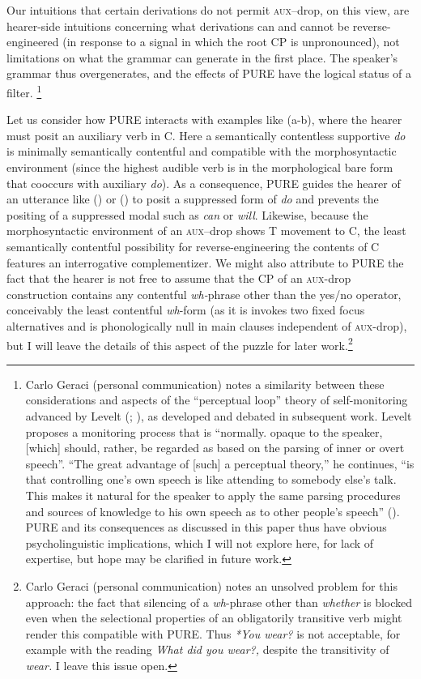 \documentclass[output=paper]{langscibook}
\begin{document}
Our intuitions that certain derivations do not permit \textsc{aux}--drop, on this view, are hearer-side intuitions concerning what derivations can and cannot be reverse-engineered (in response to a signal in which the root CP is unpronounced), not limitations on what the grammar can generate in the first place. The speaker's grammar thus overgenerates, and the effects of PURE have the logical status of a filter. \footnote{Carlo Geraci (personal communication) notes a similarity between these considerations and aspects of the “perceptual loop” theory of self-monitoring advanced by Levelt (\citeyear[96]{Levelt:1983aa}; \citeyear[chapter 12]{Levelt:1989aa}), as developed and debated in subsequent work. Levelt proposes a monitoring process that is “normally. opaque to the speaker, {[}which{]} should, rather, be regarded as based on the parsing of inner or overt speech”. “The great advantage of {[}such{]} a perceptual theory,” he continues, “is that controlling one’s own speech is like attending to somebody else’s talk. This makes it natural for the speaker to apply the same parsing procedures and sources of knowledge to his own speech as to other people’s speech” (\citealt[96-97]{Levelt:1983aa}). PURE and its consequences as discussed in this paper thus have obvious psycholinguistic implications, which I will not explore here, for lack of expertise, but hope may be clarified in future work.}

\largerpage[3]
Let us consider how PURE interacts with examples like \noindent (a-b), where the hearer must posit an auxiliary verb in C. Here a semantically contentless supportive \textit{do }is minimally semantically contentful and compatible with the morphosyntactic environment (since the highest audible verb is in the morphological bare form that cooccurs with auxiliary \textit{do}). As a consequence, PURE guides the hearer of an utterance like \noindent () or \noindent () to posit a suppressed form of \textit{do} and prevents the positing of a suppressed modal such as \textit{can }or \textit{will}. Likewise, because the morphosyntactic environment of an \textsc{aux}--drop shows T movement to C, the least semantically contentful possibility for reverse-engineering the contents of C features an interrogative complementizer. We might also attribute to PURE the fact that the hearer is not free to assume that the CP of an \textsc{aux-}drop construction contains any contentful \textit{wh-}phrase other than the yes/no operator, conceivably the least contentful \textit{wh}-form (as it is invokes two fixed focus alternatives and is phonologically null in main clauses independent of \textsc{aux-}drop), but I will leave the details of this aspect of the puzzle for later work.\footnote{Carlo Geraci (personal communication) notes an unsolved problem for this approach: the fact that silencing of a \textit{wh}-phrase other than \textit{whether} is blocked even when the selectional properties of an obligatorily transitive verb might render this compatible with PURE. Thus \textit{{*}You wear? }is not acceptable, for example with the reading \textit{What did you wear?, }despite the transitivity of \textit{wear. }I leave this issue open.} 
\end{document}

